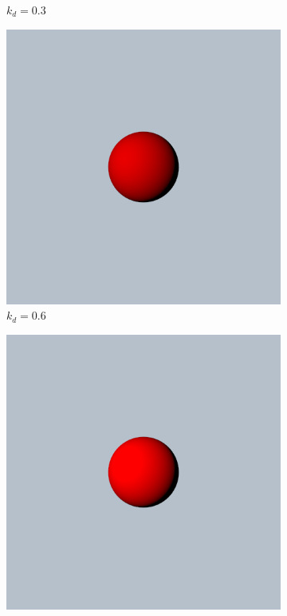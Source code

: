\documentclass{article}
\begin{document}
\begin{figure}[h]
\begin{subfigure}{0.2\textwidth}
		\caption{$k_{d} = 0.3$}
		\label{fig:diffuse_0.3}
	\end{subfigure}%
	\hfill
	\begin{subfigure}{0.2\textwidth}
		\includegraphics[width=\textwidth]{diffuse_0_6}
		\caption{$k_{d} = 0.6$}
		\label{fig:diffuse_0.6}
	\end{subfigure}%
	\hfill
	\begin{subfigure}{0.2\textwidth}
		\includegraphics[width=\textwidth]{diffuse_0_9}

\end{subfigure}
\end{figure}
\end{document}
